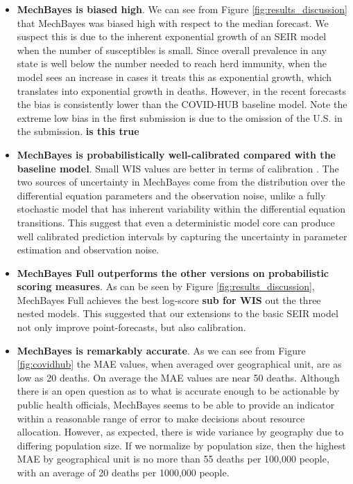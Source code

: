 \documentclass[11pt]{amsart}
\begin{document}
\begin{itemize}
\item \textbf{MechBayes is biased high}. We can see from Figure \ref{fig:results_discussion} that MechBayes was biased high with respect to the median forecast. We suspect this is due to the inherent exponential growth of an SEIR model when the number of susceptibles is small. Since overall prevalence in any state is well below the number needed to reach herd immunity, when the model sees an increase in cases it treats this as exponential growth, which translates into exponential growth in deaths. However, in the recent forecasts the bias is consistently lower than the COVID-HUB baseline model. Note the extreme low bias in the first submission is due to the omission of the U.S. in the submission. \textbf{is this true} 
\item \textbf{MechBayes is probabilistically well-calibrated compared with the baseline model}. Small WIS values are better in terms of calibration \cite{bracher2020evaluating}. The two sources of uncertainty in MechBayes come from the distribution over the differential equation parameters and the observation noise, unlike a fully stochastic model that has inherent variability within the differential equation transitions. This suggest that even a deterministic model core can produce well calibrated prediction intervals by capturing the uncertainty in parameter estimation and observation noise. 


\item \textbf{MechBayes Full outperforms the other versions on probabilistic scoring measures}. As can be seen by Figure \ref{fig:results_discussion}, MechBayes Full achieves the best log-score \textbf{sub for WIS } out the three nested models. This suggested that our extensions to the basic SEIR model not only improve point-forecasts, but also calibration. 

\item \textbf{MechBayes is remarkably accurate}. As we can see from Figure \ref{fig:covidhub} the MAE values, when averaged over geographical unit, are as low as 20 deaths. On average the MAE values are near 50 deaths. Although there is an open question as to what is accurate enough to be actionable by public health officials, MechBayes seems to be able to provide an indicator within a reasonable range of error to make decisions about resource allocation. However, as expected, there is wide variance by geography due to differing population size. If we normalize by population size, then the highest MAE by geographical unit is no more than 55 deaths per 100,000 people, with an average of 20 deaths per 1000,000 people.
\end{itemize}
\end{document}
